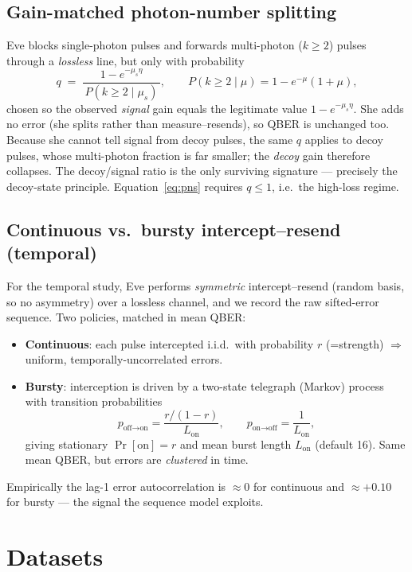 \documentclass[11pt]{article}
\begin{document}
\subsection{Gain-matched photon-number splitting}\label{sec:pns}
Eve blocks single-photon pulses and forwards multi-photon ($k\ge2$) pulses through a
\emph{lossless} line, but only with probability
\begin{equation}
  q \;=\; \frac{1-e^{-\mu_s\eta}}{\,P(k\ge 2\mid \mu_s)\,},
  \qquad P(k\ge2\mid\mu)=1-e^{-\mu}(1+\mu),
  \label{eq:pns}
\end{equation}
chosen so the observed \emph{signal} gain equals the legitimate value
$1-e^{-\mu_s\eta}$. She adds no error (she splits rather than measure--resends), so
QBER is unchanged too. Because she cannot tell signal from decoy pulses, the same
$q$ applies to decoy pulses, whose multi-photon fraction is far smaller; the
\emph{decoy} gain therefore collapses. The decoy/signal ratio is the only surviving
signature --- precisely the decoy-state principle. Equation~\eqref{eq:pns} requires
$q\le1$, i.e.\ the high-loss regime.

\subsection{Continuous vs.\ bursty intercept--resend (temporal)}
For the temporal study, Eve performs \emph{symmetric} intercept--resend (random
basis, so no asymmetry) over a lossless channel, and we record the raw sifted-error
sequence. Two policies, matched in mean QBER:
\begin{itemize}
  \item \textbf{Continuous}: each pulse intercepted i.i.d.\ with probability
  $r$ (=strength) $\Rightarrow$ uniform, temporally-uncorrelated errors.
  \item \textbf{Bursty}: interception is driven by a two-state telegraph
  (Markov) process with transition probabilities
  \[
    p_{\text{off}\to\text{on}}=\frac{r/(1-r)}{L_{\text{on}}},\qquad
    p_{\text{on}\to\text{off}}=\frac{1}{L_{\text{on}}},
  \]
  giving stationary $\Pr[\text{on}]=r$ and mean burst length $L_{\text{on}}$
  (default 16). Same mean QBER, but errors are \emph{clustered} in time.
\end{itemize}
Empirically the lag-1 error autocorrelation is $\approx 0$ for continuous and
$\approx +0.10$ for bursty --- the signal the sequence model exploits.

\section{Datasets}
\end{document}
